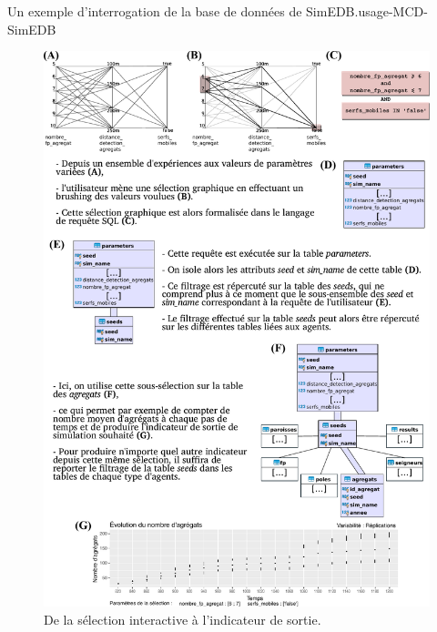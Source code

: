 \begin{encadre}{Un exemple d'interrogation de la base de données de SimEDB.}{usage-MCD-SimEDB}
	\begin{figure}[H]
		\centering
		\captionsetup{width=\linewidth}
		\includegraphics[width=\linewidth]{img/MCD_exemple_requetes_v2.pdf}
		\caption{De la sélection interactive à l'indicateur de sortie.}
		\label{fig:MCD_SimEDB_etapes}
	\end{figure}
	\smallskip
\end{encadre}

